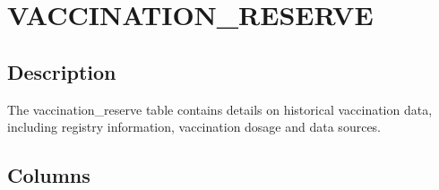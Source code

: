 \documentclass[
  letterpaper,
  DIV=11,
  numbers=noendperiod]{scrreprt}
\begin{document}
\hypertarget{vaccination_reserve}{%
\chapter*{VACCINATION\_RESERVE}\label{vaccination_reserve}}

\hypertarget{description-45}{%
\section*{Description}\label{description-45}}

The vaccination\_reserve table contains details on historical
vaccination data, including registry information, vaccination dosage and
data sources.

\hypertarget{columns-45}{%
\section*{Columns}\label{columns-45}}
\end{document}
